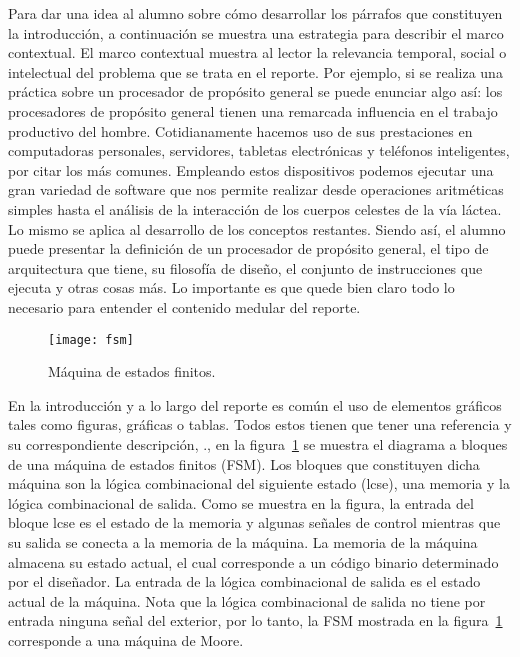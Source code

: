 \documentclass[12pt]{article}
\begin{document}
Para dar una idea al alumno sobre cómo desarrollar los párrafos que constituyen 
la introducción, a continuación se muestra una estrategia para describir el 
marco contextual. El marco contextual muestra al lector la relevancia temporal,
social o intelectual del problema que se trata en el reporte. Por ejemplo, si
se realiza una práctica sobre un procesador de propósito general se puede 
enunciar algo así: los procesadores de propósito general tienen una remarcada 
influencia en el trabajo productivo del hombre. Cotidianamente hacemos uso de 
sus prestaciones en computadoras personales, servidores, tabletas electrónicas 
y teléfonos inteligentes, por citar los más comunes. Empleando estos 
dispositivos podemos ejecutar una gran variedad de software que nos permite 
realizar desde operaciones aritméticas simples hasta el análisis de la 
interacción de los cuerpos celestes de la vía láctea. Lo mismo se aplica al 
desarrollo de los conceptos restantes. Siendo así, el alumno puede presentar 
la definición de un procesador de propósito general, el tipo de arquitectura 
que tiene, su filosofía de diseño, el conjunto de instrucciones que ejecuta y 
otras cosas más. Lo importante es que quede bien claro todo lo necesario para 
entender el contenido medular del reporte.

\begin{figure}[t] %
    \centering
    \texttt{[image: fsm]}
    \caption{Máquina de estados finitos.}
    \label{fig:fsm}
\end{figure}

En la introducción y a lo largo del reporte es común el uso de elementos 
gráficos tales como figuras, gráficas o tablas. Todos estos tienen que tener 
una referencia y su correspondiente descripción, \eg., en la 
figura~\ref{fig:fsm} se muestra el diagrama a bloques de una máquina de estados 
finitos (FSM). Los bloques que constituyen dicha máquina son la lógica 
combinacional del siguiente estado (lcse), una memoria y la lógica combinacional 
de salida. Como se muestra en la figura, la entrada del bloque lcse es el estado 
de la memoria y algunas señales de control mientras que su salida se conecta a 
la memoria de la máquina. La memoria de la máquina almacena su estado actual, 
el cual corresponde a un código binario determinado por el diseñador. 
La entrada de la lógica combinacional de salida es el estado actual de la 
máquina. Nota que la lógica combinacional de salida no tiene por entrada ninguna 
señal del exterior, por lo tanto, la FSM mostrada en la figura~\ref{fig:fsm} 
corresponde a una máquina de Moore.
\end{document}
